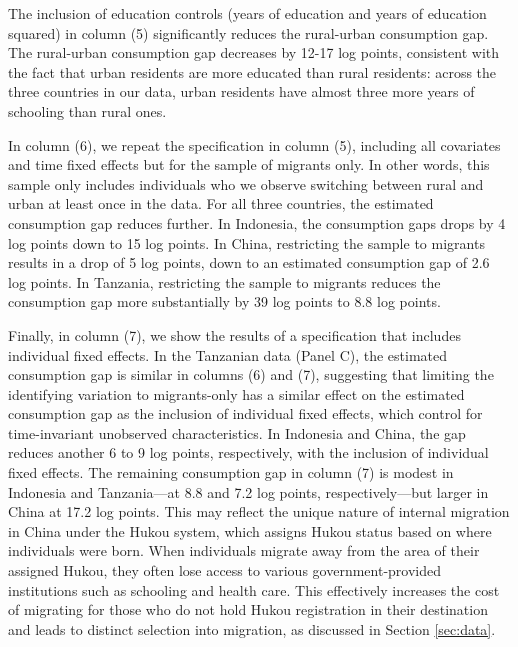 \documentclass[12pt]{article}
\begin{document}
The inclusion of education controls (years of education and years of education squared) in column (5) significantly reduces the rural-urban consumption gap.
The rural-urban consumption gap decreases by 12-17 log points, consistent with the fact that urban residents are more educated than rural residents: 
across the three countries in our data, urban residents have almost three more years of schooling than rural ones.

In column (6), we repeat the specification in column (5), including all covariates and time fixed effects but for the sample of migrants only.
In other words, this sample only includes individuals who we observe switching between rural and urban at least once in the data.
For all three countries, the estimated consumption gap reduces further. 
In Indonesia, the consumption gaps drops by 4 log points down to 15 log points.
In China, restricting the sample to migrants results in a drop of 5 log points, down to an estimated consumption gap of 2.6 log points.
In Tanzania, restricting the sample to migrants reduces the consumption gap more substantially by 39 log points to 8.8 log points.

Finally, in column (7), we show the results of a specification that includes individual fixed effects. 
In the Tanzanian data (Panel C), the estimated consumption gap is similar in columns (6) and (7), suggesting that limiting the identifying variation to migrants-only has a similar effect on the estimated consumption gap as the inclusion of individual fixed effects, which control for time-invariant unobserved characteristics. 
In Indonesia and China, the gap reduces another 6 to 9 log points, respectively, with the inclusion of individual fixed effects. 
The remaining consumption gap in column (7) is modest in Indonesia and Tanzania—at 8.8 and 7.2 log points, respectively—but larger in China at 17.2 log points. This may reflect the unique nature of internal migration in China under the Hukou system, which assigns Hukou status based on where individuals were born. When individuals migrate away from the area of their assigned Hukou, they often lose access to various government-provided institutions such as schooling and health care. This effectively increases the cost of migrating for those who do not hold Hukou registration in their destination and leads to distinct selection into migration, as discussed in Section \ref{sec:data}. 



\begin{landscape}
    
\end{landscape}
\end{document}

